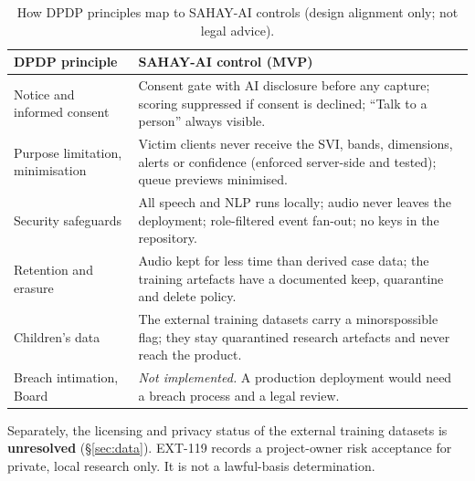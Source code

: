 \documentclass[11pt,a4paper]{article}
\newcommand{\codeus}{\textunderscore\allowbreak}
\DeclareRobustCommand{\code}[1]{{\ttfamily\let\_\codeus #1}}
\begin{document}
\begin{table}[!htbp]
\centering\small
\caption{How DPDP principles map to SAHAY-AI controls (design alignment only; not legal advice).}
\label{tab:dpdp}
\begin{tabularx}{\linewidth}{@{}>{\raggedright\arraybackslash}p{4.2cm}X@{}}
\toprule
DPDP principle & SAHAY-AI control (MVP) \\
\midrule
Notice and informed consent & Consent gate with AI disclosure before any capture; scoring suppressed if consent is declined; ``Talk to a person'' always visible. \\
Purpose limitation, minimisation & Victim clients never receive the SVI, bands, dimensions, alerts or confidence (enforced server-side and tested); queue previews minimised. \\
Security safeguards & All speech and NLP runs locally; audio never leaves the deployment; role-filtered event fan-out; no keys in the repository. \\
Retention and erasure & Audio kept for less time than derived case data; the training artefacts have a documented keep, quarantine and delete policy. \\
Children's data & The external training datasets carry a \code{minors\_possible} flag; they stay quarantined research artefacts and never reach the product. \\
Breach intimation, Board & \emph{Not implemented.} A production deployment would need a breach process and a legal review. \\
\bottomrule
\end{tabularx}
\end{table}

\noindent Separately, the licensing and privacy status of the external training datasets is
\textbf{unresolved} (\S\ref{sec:data}). EXT-119 records a project-owner risk acceptance for private,
local research only. It is not a lawful-basis determination.
\end{document}
